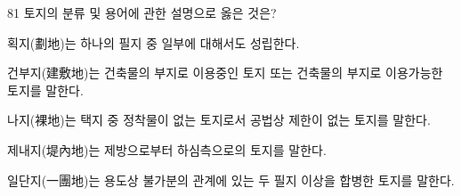 \begin{question}{81}
토지의 분류 및 용어에 관한 설명으로 옳은 것은?
\begin{choices}
  \item 획지(劃地)는 하나의 필지 중 일부에 대해서도 성립한다.
  \item 건부지(建敷地)는 건축물의 부지로 이용중인 토지 또는 건축물의 부지로 이용가능한 토지를 말한다.
  \item 나지(裸地)는 택지 중 정착물이 없는 토지로서 공법상 제한이 없는 토지를 말한다.
  \item 제내지(堤內地)는 제방으로부터 하심측으로의 토지를 말한다.
  \item 일단지(一團地)는 용도상 불가분의 관계에 있는 두 필지 이상을 합병한 토지를 말한다.
\end{choices}
\end{question}
